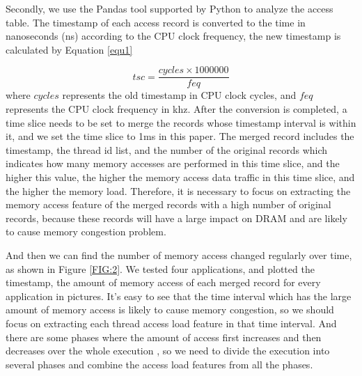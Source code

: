 \documentclass[a4paper,fleqn]{cas-sc}
\begin{document}
Secondly, we use the Pandas tool supported by Python to analyze the access table. The timestamp of each access record is converted to the time in nanoseconds (ns) according to the CPU clock frequency, the new timestamp is calculated by Equation \ref{equ1}

\begin{equation} \label{equ1}
	tsc=\frac{cycles\times1000000}{feq}
\end{equation}where $cycles$ represents the old timestamp in CPU clock cycles, and $feq$ represents the CPU clock frequency in khz. After the conversion is completed, a time slice needs to be set to merge the records whose timestamp interval is within it, and we set the time slice to 1ms in this paper. The merged record includes the timestamp, the thread id list, and the number of the original records which indicates how many memory accesses are performed in this time slice, and the higher this value, the higher the memory access data traffic in this time slice, and the higher the memory load. Therefore, it is necessary to focus on extracting the memory access feature of the merged records with a high number of original records, because these records will have a large impact on DRAM and are likely to cause memory congestion problem.

And then we can find the number of memory access changed regularly over time, as shown in Figure \ref{FIG:2}. We tested four applications, and plotted the timestamp, the amount of memory access of each merged record for every application in pictures. It’s easy to see that the time interval which has the large amount of memory access is likely to cause memory congestion, so we should focus on extracting each thread access load feature in that time interval. And there are some phases where the amount of access first increases and then decreases over the whole execution , so we need to divide the execution into several phases and combine the access load features from all the phases. 
\end{document}
